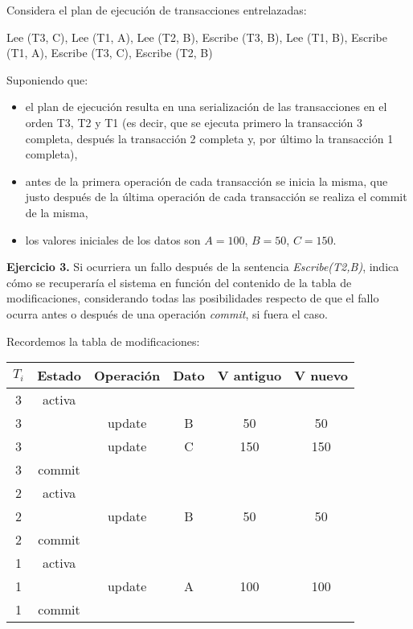 \documentclass[12pt]{report}
\begin{document}
Considera el plan de ejecución de transacciones entrelazadas:

Lee (T3, C), Lee (T1, A), Lee (T2, B), Escribe (T3, B),
Lee (T1, B), Escribe (T1, A), Escribe (T3, C), Escribe (T2, B)

Suponiendo que:
\begin{itemize}
\item el plan de ejecución resulta en una serialización de las transacciones en el orden T3, T2 y T1
(es decir, que se ejecuta primero la transacción 3 completa, después la transacción 2
completa y, por último la transacción 1 completa), 
\item antes de la primera operación de cada transacción se inicia la misma, que justo después de la última operación de cada transacción se realiza el commit de la misma, 
\item los valores iniciales de los datos son $A=100$, $B=50$, $C=150$.
\end{itemize}

\textbf{Ejercicio 3.} Si ocurriera un fallo después de la sentencia \textit{Escribe(T2,B)}, indica cómo se recuperaría el sistema en función del contenido de la tabla de modificaciones, considerando todas las posibilidades respecto de que el fallo ocurra antes o después de una operación \textit{commit}, si fuera el caso.

Recordemos la tabla de modificaciones:
\begin{center}
\begin{tabular}{|c|c|c|c|c|c|}
\hline 
$T_i$ & Estado & Operación & Dato & V antiguo & V nuevo \\ 
\hline 
3 & activa &   &   &   &   \\ 
\hline 
3 &   & update & B & 50 & 50 \\ 
\hline 
3 &   & update & C & 150 & 150 \\ 
\hline 
3 & commit &   &   &   &   \\ 
\hline 
2 & activa &   &   &   &   \\ 
\hline 
2 &   & update & B & 50 & 50 \\ 
\hline 
2 & commit &   &   &   &   \\ 
\hline 
1 & activa &   &   &   &   \\ 
\hline 
1 &   & update & A & 100 & 100 \\ 
\hline 
1 & commit &  &  &  &  \\ 
\hline 
\end{tabular} 
\end{center}
\end{document}
